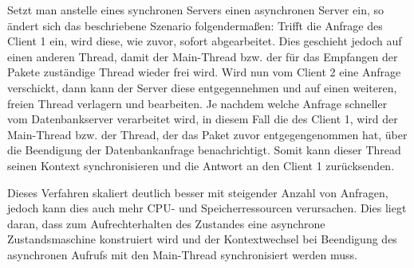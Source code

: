 Setzt man anstelle eines synchronen Servers einen asynchronen Server ein, so ändert sich das beschriebene Szenario folgendermaßen: Trifft die Anfrage des Client 1 ein, wird diese, wie zuvor, sofort abgearbeitet. Dies geschieht jedoch auf einen anderen Thread, damit der Main-Thread bzw. der für das Empfangen der Pakete zuständige Thread wieder frei wird. Wird nun vom Client 2 eine Anfrage verschickt, dann kann der Server diese entgegennehmen und auf einen weiteren, freien Thread verlagern und bearbeiten. Je nachdem welche Anfrage schneller vom Datenbankserver verarbeitet wird, in diesem Fall die des Client 1, wird der Main-Thread bzw. der Thread, der das Paket zuvor entgegengenommen hat, über die Beendigung der Datenbankanfrage benachrichtigt. Somit kann dieser Thread seinen Kontext synchronisieren und die Antwort an den Client 1 zurücksenden.

Dieses Verfahren skaliert deutlich besser mit steigender Anzahl von Anfragen, jedoch kann dies auch mehr CPU- und Speicherressourcen verursachen. Dies liegt daran, dass zum Aufrechterhalten des Zustandes eine asynchrone Zustandsmaschine konstruiert wird und der Kontextwechsel bei Beendigung des asynchronen Aufrufs mit den Main-Thread synchronisiert werden muss.

